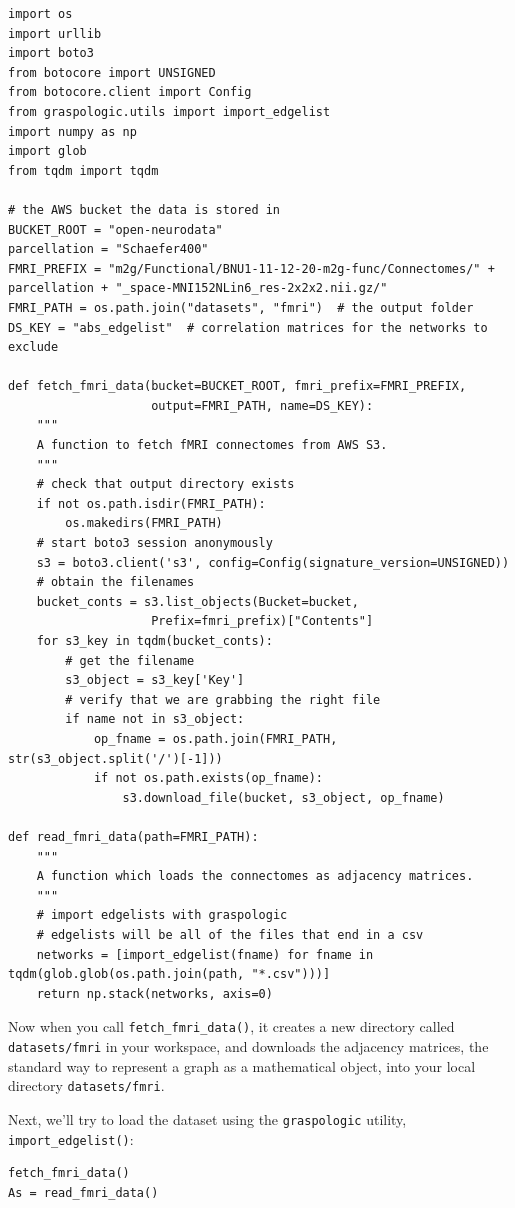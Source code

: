 \begin{lstlisting}[style=python]
import os
import urllib
import boto3
from botocore import UNSIGNED
from botocore.client import Config
from graspologic.utils import import_edgelist
import numpy as np
import glob
from tqdm import tqdm

# the AWS bucket the data is stored in
BUCKET_ROOT = "open-neurodata"
parcellation = "Schaefer400"
FMRI_PREFIX = "m2g/Functional/BNU1-11-12-20-m2g-func/Connectomes/" + parcellation + "_space-MNI152NLin6_res-2x2x2.nii.gz/"
FMRI_PATH = os.path.join("datasets", "fmri")  # the output folder
DS_KEY = "abs_edgelist"  # correlation matrices for the networks to exclude

def fetch_fmri_data(bucket=BUCKET_ROOT, fmri_prefix=FMRI_PREFIX,
                    output=FMRI_PATH, name=DS_KEY):
    """
    A function to fetch fMRI connectomes from AWS S3.
    """
    # check that output directory exists
    if not os.path.isdir(FMRI_PATH):
        os.makedirs(FMRI_PATH)
    # start boto3 session anonymously
    s3 = boto3.client('s3', config=Config(signature_version=UNSIGNED))
    # obtain the filenames
    bucket_conts = s3.list_objects(Bucket=bucket, 
                    Prefix=fmri_prefix)["Contents"]
    for s3_key in tqdm(bucket_conts):
        # get the filename
        s3_object = s3_key['Key']
        # verify that we are grabbing the right file
        if name not in s3_object:
            op_fname = os.path.join(FMRI_PATH, str(s3_object.split('/')[-1]))
            if not os.path.exists(op_fname):
                s3.download_file(bucket, s3_object, op_fname)

def read_fmri_data(path=FMRI_PATH):
    """
    A function which loads the connectomes as adjacency matrices.
    """
    # import edgelists with graspologic
    # edgelists will be all of the files that end in a csv
    networks = [import_edgelist(fname) for fname in tqdm(glob.glob(os.path.join(path, "*.csv")))]
    return np.stack(networks, axis=0)
\end{lstlisting}

Now when you call \texttt{fetch\_fmri\_data()}, it creates a new directory called \texttt{datasets/fmri} in your workspace, and downloads the adjacency matrices, the standard way to represent a graph as a mathematical object, into your local directory \texttt{datasets/fmri}.

Next, we'll try to load the dataset using the \texttt{graspologic} utility, \texttt{import\_edgelist()}:

\begin{lstlisting}[style=python]
fetch_fmri_data()
As = read_fmri_data()
\end{lstlisting}

